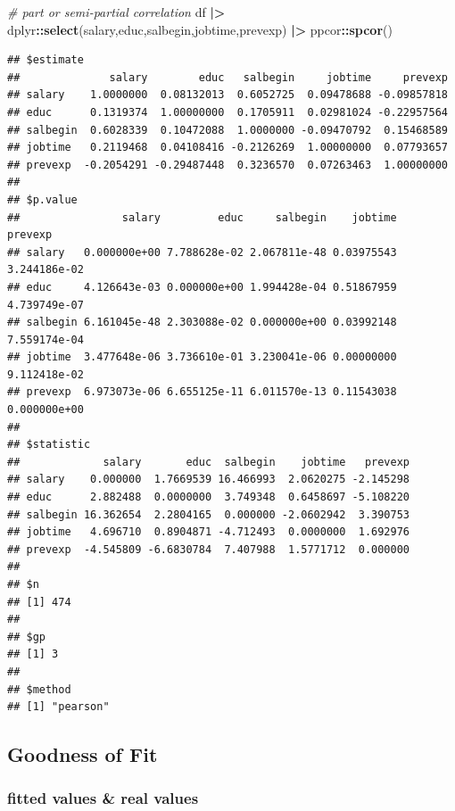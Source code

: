 \documentclass[
]{ctexart}
\newenvironment{Shaded}{\begin{snugshade}}{\end{snugshade}}
\newcommand{\CommentTok}[1]{\textcolor[rgb]{0.56,0.35,0.01}{\textit{#1}}}
\newcommand{\FunctionTok}[1]{\textcolor[rgb]{0.13,0.29,0.53}{\textbf{#1}}}
\newcommand{\NormalTok}[1]{#1}
\newcommand{\SpecialCharTok}[1]{\textcolor[rgb]{0.81,0.36,0.00}{\textbf{#1}}}
\begin{document}
\begin{Shaded}
\begin{Highlighting}[]
\CommentTok{\# part or semi{-}partial correlation}
\NormalTok{df }\SpecialCharTok{|\textgreater{}}\NormalTok{ dplyr}\SpecialCharTok{::}\FunctionTok{select}\NormalTok{(salary,educ,salbegin,jobtime,prevexp) }\SpecialCharTok{|\textgreater{}} 
\NormalTok{  ppcor}\SpecialCharTok{::}\FunctionTok{spcor}\NormalTok{()}
\end{Highlighting}
\end{Shaded}

\begin{verbatim}
## $estimate
##              salary        educ   salbegin     jobtime     prevexp
## salary    1.0000000  0.08132013  0.6052725  0.09478688 -0.09857818
## educ      0.1319374  1.00000000  0.1705911  0.02981024 -0.22957564
## salbegin  0.6028339  0.10472088  1.0000000 -0.09470792  0.15468589
## jobtime   0.2119468  0.04108416 -0.2126269  1.00000000  0.07793657
## prevexp  -0.2054291 -0.29487448  0.3236570  0.07263463  1.00000000
## 
## $p.value
##                salary         educ     salbegin    jobtime      prevexp
## salary   0.000000e+00 7.788628e-02 2.067811e-48 0.03975543 3.244186e-02
## educ     4.126643e-03 0.000000e+00 1.994428e-04 0.51867959 4.739749e-07
## salbegin 6.161045e-48 2.303088e-02 0.000000e+00 0.03992148 7.559174e-04
## jobtime  3.477648e-06 3.736610e-01 3.230041e-06 0.00000000 9.112418e-02
## prevexp  6.973073e-06 6.655125e-11 6.011570e-13 0.11543038 0.000000e+00
## 
## $statistic
##             salary       educ  salbegin    jobtime   prevexp
## salary    0.000000  1.7669539 16.466993  2.0620275 -2.145298
## educ      2.882488  0.0000000  3.749348  0.6458697 -5.108220
## salbegin 16.362654  2.2804165  0.000000 -2.0602942  3.390753
## jobtime   4.696710  0.8904871 -4.712493  0.0000000  1.692976
## prevexp  -4.545809 -6.6830784  7.407988  1.5771712  0.000000
## 
## $n
## [1] 474
## 
## $gp
## [1] 3
## 
## $method
## [1] "pearson"
\end{verbatim}

\hypertarget{goodness-of-fit-2}{%
\subsection{Goodness of Fit}\label{goodness-of-fit-2}}

\hypertarget{fitted-values-real-values}{%
\subsubsection{fitted values \& real
values}\label{fitted-values-real-values}}
\end{document}
